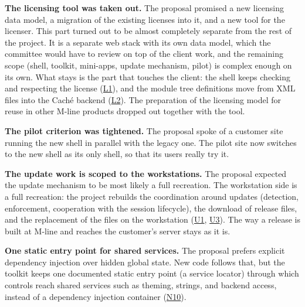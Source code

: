 \documentclass{article}
\newcommand{\req}[1]{\hyperlink{req:#1}{#1}}
\begin{document}
\medskip
\noindent \textbf{The licensing tool was taken out.} The proposal promised a new licensing data model, a migration of the existing licenses into it, and a new tool for the licenser. This part turned out to be almost completely separate from the rest of the project. It is a separate web stack with its own data model, which the committee would have to review on top of the client work, and the remaining scope (shell, toolkit, mini-apps, update mechanism, pilot) is complex enough on its own. What stays is the part that touches the client: the shell keeps checking and respecting the license (\req{L1}), and the module tree definitions move from XML files into the Caché backend (\req{L2}). The preparation of the licensing model for reuse in other M-line products dropped out together with the tool.

\medskip
\noindent \textbf{The pilot criterion was tightened.} The proposal spoke of a customer site running the new shell in parallel with the legacy one. The pilot site now switches to the new shell as its only shell, so that its users really try it.

\medskip
\noindent \textbf{The update work is scoped to the workstations.} The proposal expected the update mechanism to be most likely a full recreation. The workstation side is a full recreation: the project rebuilds the coordination around updates (detection, enforcement, cooperation with the session lifecycle), the download of release files, and the replacement of the files on the workstation (\req{U1}, \req{U3}). The way a release is built at M-line and reaches the customer's server stays as it is.

\medskip
\noindent \textbf{One static entry point for shared services.} The proposal prefers explicit dependency injection over hidden global state. New code follows that, but the toolkit keeps one documented static entry point (a service locator) through which controls reach shared services such as theming, strings, and backend access, instead of a dependency injection container (\req{N10}).
\end{document}
